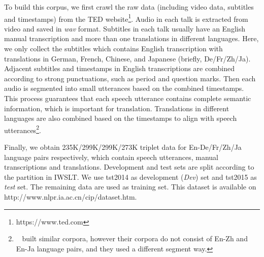 \documentclass[letterpaper]{article} %
\begin{document}
To build this corpus, we first crawl the raw data (including video data, subtitles and timestamps) from the TED website\footnote{https://www.ted.com}. Audio in each talk is extracted from video and saved in \textit{wav} format. Subtitles in each talk usually have an English manual transcription and more than one translations in different languages. Here, we only collect the subtitles which contains English transcription with translations in German, French, Chinese, and Japanese (briefly, De/Fr/Zh/Ja). Adjacent subtitles and timestamps in English transcriptions are combined according to strong punctuations, such as period and question marks. Then each audio is segmented into small utterances based on the combined timestamps. This process guarantees that each speech utterance contains complete semantic information, which is important for translation. Translations in different languages are also combined based on the timestamps to align with speech utterances\footnote{\citeauthor{gangi2019must}~ built similar corpora, however their corpora do not consist of En-Zh and En-Ja language pairs, and they used a different segment way.}.

Finally, we obtain 235K/299K/299K/273K triplet data for En-De/Fr/Zh/Ja language pairs respectively, which contain speech utterances, manual transcriptions and translations.
Development and test sets are split according to the partition in IWSLT. We use tst2014 as development (\textit{Dev})  set and tst2015 as \textit{test} set. The remaining data are used as training set. This dataset is available on http://www.nlpr.ia.ac.cn/cip/dataset.htm.
\end{document}
